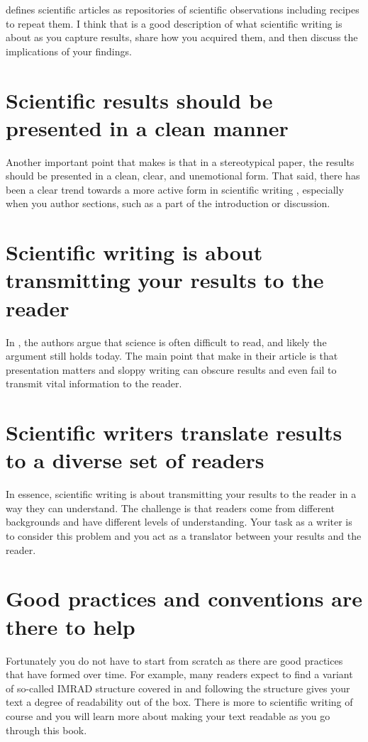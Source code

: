 \citet{katz2009research} defines scientific articles as repositories of scientific observations including recipes to repeat them. I think that is a good description of what scientific writing is about as you capture results, share how you acquired them, and then discuss the implications of your findings.

\section{Scientific results should be presented in a clean manner}

Another important point that \citet{katz2009research} makes is that in a stereotypical paper, the results should be presented in a clean, clear, and unemotional form. That said, there has been a clear trend towards a more active form in scientific writing \citep{ryba2021better}, especially when you author sections, such as a part of the introduction or discussion.

\section{Scientific writing is about transmitting your results to the reader}

In \citet{gopen1990science}, the authors argue that science is often difficult to read, and likely the argument still holds today. The main point that \citet{gopen1990science} make in their article is that presentation matters and sloppy writing can obscure results and even fail to transmit vital information to the reader.

\section{Scientific writers translate results to a diverse set of readers}

In essence, scientific writing is about transmitting your results to the reader in a way they can understand. The challenge is that readers come from different backgrounds and have different levels of understanding. Your task as a writer is to consider this problem and you act as a translator between your results and the reader.

\section{Good practices and conventions are there to help}

Fortunately you do not have to start from scratch as there are good practices that have formed over time. For example, many readers expect to find a variant of so-called IMRAD structure covered in  and following the structure gives your text a degree of readability out of the box. There is more to scientific writing of course and you will learn more about making your text readable as you go through this book.

